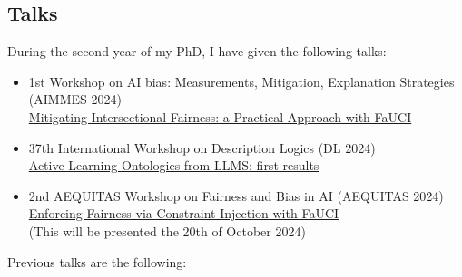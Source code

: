\documentclass[11pt]{article}
\begin{document}
\subsection{Talks}\label{subsec:talks}

During the second year of my PhD, I have given the following talks:

\begin{itemize}
	\item 1st Workshop on AI bias: Measurements, Mitigation, Explanation Strategies (AIMMES 2024)
	\\\href{https://apice.unibo.it/xwiki/bin/view/Talk/IntersectionalityAimmes2024}{Mitigating Intersectional Fairness: a Practical Approach with FaUCI}
	\item 37th International Workshop on Description Logics (DL 2024)
	\\\href{https://dl2024.w.uib.no/overview/}{Active Learning Ontologies from LLMS: first results}
	\item 2nd AEQUITAS Workshop on Fairness and Bias in AI (AEQUITAS 2024)
	\\\href{https://aequitas-aod.github.io/aequitas-ecai24.github.io/}{Enforcing Fairness via Constraint Injection with FaUCI}
	\\(This will be presented the 20th of October 2024)
\end{itemize}
%
Previous talks are the following:
%
\end{document}
